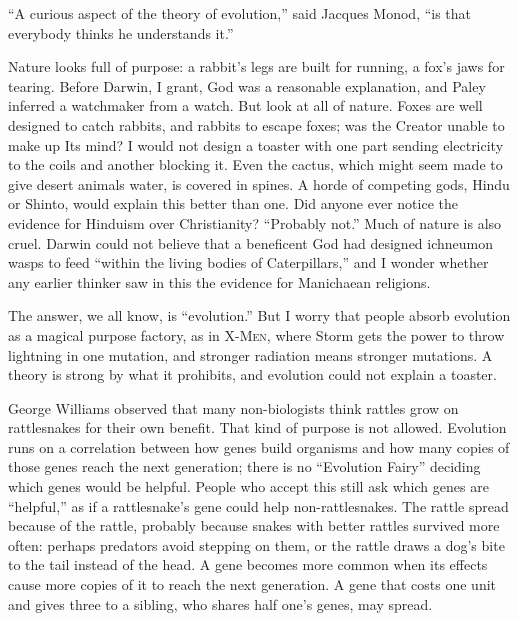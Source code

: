 
``A curious aspect of the theory of evolution,'' said Jacques Monod, ``is that everybody thinks he understands it.''

Nature looks full of purpose: a rabbit's legs are built for running, a fox's jaws for tearing. Before Darwin, I grant, God was a reasonable explanation, and Paley inferred a watchmaker from a watch. But look at all of nature. Foxes are well designed to catch rabbits, and rabbits to escape foxes; was the Creator unable to make up Its mind? I would not design a toaster with one part sending electricity to the coils and another blocking it. Even the cactus, which might seem made to give desert animals water, is covered in spines. A horde of competing gods, Hindu or Shinto, would explain this better than one. Did anyone ever notice the evidence for Hinduism over Christianity? ``Probably not.''  Much of nature is also cruel. Darwin could not believe that a beneficent God had designed ichneumon wasps to feed ``within the living bodies of Caterpillars,'' and I wonder whether any earlier thinker saw in this the evidence for Manichaean religions. 

The answer, we all know, is ``evolution.'' But I worry that people absorb evolution as a magical purpose factory, as in \textsc{X-Men}, where Storm gets the power to throw lightning in one mutation, and stronger radiation means stronger mutations. A theory is strong by what it prohibits, and evolution could not explain a toaster. 

George Williams observed that many non-biologists think rattles grow on rattlesnakes for their own benefit. That kind of purpose is not allowed. Evolution runs on a correlation between how genes build organisms and how many copies of those genes reach the next generation; there is no ``Evolution Fairy'' deciding which genes would be helpful. People who accept this still ask which genes are ``helpful,'' as if a rattlesnake's gene could help non-rattlesnakes. The rattle spread because of the rattle, probably because snakes with better rattles survived more often: perhaps predators avoid stepping on them, or the rattle draws a dog's bite to the tail instead of the head. A gene becomes more common when its effects cause more copies of it to reach the next generation. A gene that costs one unit and gives three to a sibling, who shares half one's genes, may spread.

